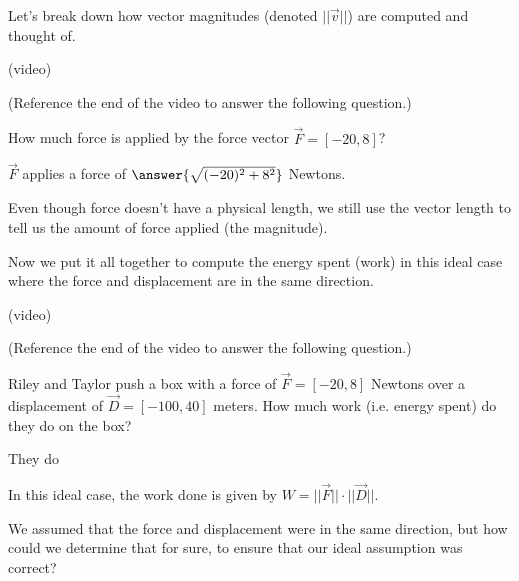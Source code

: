 \documentclass{ximera}
\begin{document}
Let's break down how vector magnitudes (denoted $||\vec{v}||$) are computed and thought of.

(video)

\begin{problem}
    (Reference the end of the video to answer the following question.)

    How much force is applied by the force vector $\vec{F}=[-20,8]$?

    $\vec{F}$ applies a force of $\answer{\sqrt{(-20)^2+8^2}}$ Newtons.

    \begin{feedback}
        Even though force doesn't have a physical length, we still use the vector length to tell us the amount of force applied (the magnitude).
    \end{feedback}
\end{problem}

Now we put it all together to compute the energy spent (work) in this ideal case where the force and displacement are in the same direction.

(video)

\begin{problem}
    (Reference the end of the video to answer the following question.)

    Riley and Taylor push a box with a force of $\vec{F}=[-20,8]$ Newtons over a displacement of $\vec{D}=[-100,40]$ meters. How much work (i.e. energy spent) do they do on the box?

    They do 

    \begin{multipleChoice}
    \end{multipleChoice}

    \begin{feedback}
        In this ideal case, the work done is given by $W=||\vec{F}||\cdot||\vec{D}||$.
    \end{feedback}

\end{problem}

We assumed that the force and displacement were in the same direction, but how could we determine that for sure, to ensure that our ideal assumption was correct?
\end{document}
